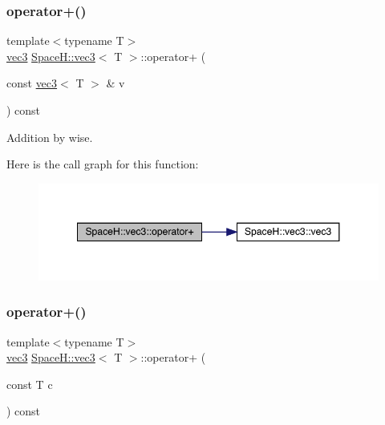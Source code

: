 \subsubsection{\texorpdfstring{operator+()}{operator+()}\hspace{0.1cm}{\footnotesize\ttfamily [4/7]}}
{\footnotesize\ttfamily template$<$typename T$>$ \\
\mbox{\hyperlink{struct_space_h_1_1vec3}{vec3}} \mbox{\hyperlink{struct_space_h_1_1vec3}{Space\+H\+::vec3}}$<$ T $>$\+::operator+ (\begin{DoxyParamCaption}\item[{const \mbox{\hyperlink{struct_space_h_1_1vec3}{vec3}}$<$ T $>$ \&}]{v }\end{DoxyParamCaption}) const\hspace{0.3cm}{\ttfamily [inline]}}



Addition by wise. 

Here is the call graph for this function\+:
\nopagebreak
\begin{figure}[H]
\begin{center}
\leavevmode
\includegraphics[width=348pt]{struct_space_h_1_1vec3_a439dd37afaf3c046cd58b370b9d70b80_cgraph}
\end{center}
\end{figure}
\mbox{\label{struct_space_h_1_1vec3_a9271a40ff2a3d64a97f37e53fb668d07}} 
\subsubsection{\texorpdfstring{operator+()}{operator+()}\hspace{0.1cm}{\footnotesize\ttfamily [5/7]}}
{\footnotesize\ttfamily template$<$typename T$>$ \\
\mbox{\hyperlink{struct_space_h_1_1vec3}{vec3}} \mbox{\hyperlink{struct_space_h_1_1vec3}{Space\+H\+::vec3}}$<$ T $>$\+::operator+ (\begin{DoxyParamCaption}\item[{const T}]{c }\end{DoxyParamCaption}) const\hspace{0.3cm}{\ttfamily [inline]}}



